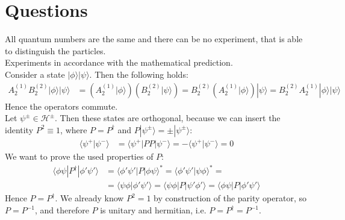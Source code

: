 \documentclass[english, parskip=full]{scrartcl}
\title{\titel}
\author{\autor}
\date{\today}
\newcommand{\brak}{}
\newcommand{\braket}{}
\newcommand{\kla}{}
\newcommand{\Ket}{}
\begin{document}
\maketitle  %

\section{Questions}
All quantum numbers are the same and there can be no experiment, that is able to distinguish the particles.
\\
Experiments in accordance with the mathematical prediction.
\\
Consider a state $\Ket | {\phi} \rangle\Ket | {\psi} \rangle$. Then the following holds:
\begin{align*}
A_2^{(1)}B_2^{(2)}\Ket | {\phi} \rangle\Ket | {\psi} \rangle&=\kla\left( {A_2^{(1)}\Ket | {\phi} \rangle} \right)\kla\left( {B_2^{(2)}\Ket | {\psi} \rangle} \right)=B_2^{(2)}\kla\left( {A_2^{(1)}\Ket | {\phi} \rangle} \right)\Ket | {\psi} \rangle=B_2^{(2)}A_2^{(1)}\Ket | {\phi} \rangle\Ket | {\psi} \rangle
\end{align*}
Hence the operators commute.
\\
Let $\psi^\pm\in\mathcal{H}^\pm$. 
Then these states are orthogonal, because we can insert the identity $P^2\equiv 1$, where $P=P^\dagger$ and $P\Ket | {\psi^\pm} \rangle=\pm\Ket | {\psi^\pm} \rangle$:
\begin{align*}
\brak\langle {\psi^+}| {\psi^-}\rangle&=\braket\langle {\psi^+} | {PP} | {\psi^-}\rangle=-\brak\langle {\psi^+}| {\psi^-}\rangle=0
\end{align*}
We want to prove the used properties of $P$:
\begin{align*}
\braket\langle {\phi\psi} | {P^\dagger} | {\phi'\psi'}\rangle&=\braket\langle {\phi'\psi'} | {P} | {\phi\psi}\rangle^\ast=\brak\langle {\phi'\psi'}| {\psi\phi}\rangle^\ast=\\
&=\brak\langle {\psi\phi}| {\phi'\psi'}\rangle=\braket\langle {\psi\phi} | {P} | {\psi'\phi'}\rangle=\braket\langle {\phi\psi} | {P} | {\phi'\psi'}\rangle
\end{align*}
Hence $P=P^\dagger$. 
We already know $P^2=1$ by construction of the parity operator, so $P=P^{-1}$, and therefore $P$ is unitary and hermitian, i.e. $P=P^\dagger = P^{-1}$.
\end{document}
